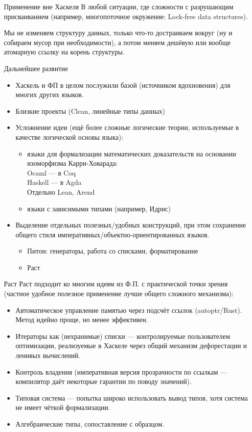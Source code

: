 \documentclass[aspectratio=169]{beamer}
\begin{document}
\begin{frame}{Применение вне Хаскеля}
В любой ситуации, где сложности с разрушающим присваиванием
(например, многопоточное окружение: Lock-free data structures).

Мы не изменяем структуру данных, только что-то достраиваем вокруг (ну и собираем мусор
при необходимости), а потом меняем дешёвую или вообще атомарную ссылку на корень структуры.
\end{frame}

\begin{frame}{Дальнейшее развитие}
\begin{itemize}
\item Хаскель и ФП в целом послужили базой (источником вдохновения) для многих других языков.
\item Близкие проекты (Clean, линейные типы данных)

\item Усложнение идеи (ещё более сложные логические теории, используемые в качестве логической 
основы языка): 
\begin{itemize}
\item языки для формализации математических доказательств на основании изоморфизма Карри-Ховарада:\\
Ocaml --- в Coq \\
Haskell --- в Agda \\
Отдельно Lean, Arend
\item языки с зависимыми типами (например, Идрис)
\end{itemize}

\item Выделение отдельных полезных/удобных конструкций, при этом сохранение общего стиля
императивных/объектно-ориентированных языков.
\begin{itemize}
\item Питон: генераторы, работа со списками, форматирование

\item Раст
\end{itemize}
\end{itemize}
\end{frame}

\begin{frame}{Раст}
Раст подходит ко многим идеям из Ф.П. с практической точки зрения
(частное удобное полезное применение лучше общего сложного механизма):
\begin{itemize}
\item Автоматическое управление памятью через подсчёт ссылок (autoptr/Rust).
Метод идейно проще, но менее эффективен.
\item Итераторы как (нехранимые) списки --- контролируемые пользователем оптимизации, реализуемые в Хаскеле
через общий механизм дефорестации и ленивых вычислений.
\item Контроль владения (императивная версия прозрачности по ссылкам --- компилятор даёт некоторые гарантии
по поводу значений).
\item Типовая система --- попытка широко использовать вывод типов, хотя система не имеет чёткой формализации.
\item Алгебраические типы, сопоставление с образцом.
\end{itemize}
\end{frame}
\end{document}
